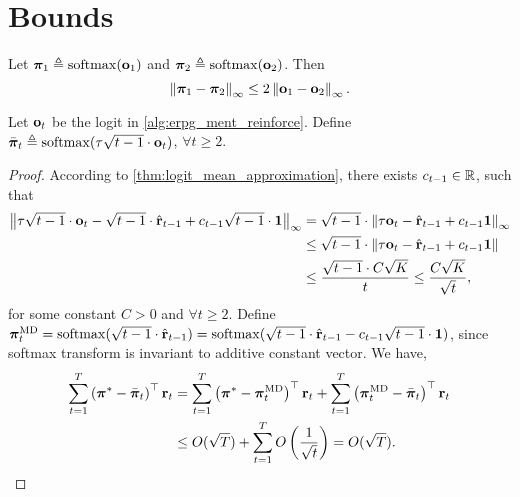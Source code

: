 \section{Bounds}

\begin{lem}
Let ${\boldsymbol{\pi}}_1 \triangleq \mathrm{softmax}({\mathbf{o}}_1)$ and ${\boldsymbol{\pi}}_2 \triangleq \mathrm{softmax}({\mathbf{o}}_2)$. Then
\begin{equation*}
    \left\| {\boldsymbol{\pi}}_1 - {\boldsymbol{\pi}}_2 \right\|_\infty \le  2 \left\| {\mathbf{o}}_1 - {\mathbf{o}}_2 \right\|_\infty.
\end{equation*}
\end{lem}

\begin{thm}
Let ${\mathbf{o}}_t$ be the logit in \cref{alg:erpg_ment_reinforce}. Define $\bar{{\boldsymbol{\pi}}}_t \triangleq \mathrm{softmax}(\tau \sqrt{t-1} \cdot {\mathbf{o}}_t)$, $\forall t \ge 2$.
\end{thm}
\begin{proof}
According to \cref{thm:logit_mean_approximation}, there exists $c_{t-1} \in {\mathbb{R}}$, such that
\begin{equation*}
\begin{split}
    \left\| \tau \sqrt{t-1} \cdot {\mathbf{o}}_t - \sqrt{t-1} \cdot \hat{{\mathbf{r}}}_{t-1} + c_{t-1} \sqrt{t-1} \cdot {\mathbf{1}} \right\|_\infty &= \sqrt{t-1} \cdot \left\| \tau {\mathbf{o}}_t - \hat{{\mathbf{r}}}_{t-1} + c_{t-1} {\mathbf{1}} \right\|_\infty \\
    &\le \sqrt{t-1} \cdot \left\| \tau {\mathbf{o}}_t - \hat{{\mathbf{r}}}_{t-1} + c_{t-1} {\mathbf{1}} \right\| \\
    &\le \frac{\sqrt{t-1} \cdot C \sqrt{K}}{t} \le \frac{C \sqrt{K}}{\sqrt{t}},
\end{split}
\end{equation*}
for some constant $C > 0$ and $\forall t \ge 2$. Define ${\boldsymbol{\pi}}_t^{\text{MD}} = \mathrm{softmax}(\sqrt{t-1} \cdot \hat{{\mathbf{r}}}_{t-1}) = \mathrm{softmax}(\sqrt{t-1} \cdot \hat{{\mathbf{r}}}_{t-1} - c_{t-1} \sqrt{t-1} \cdot {\mathbf{1}})$, since softmax transform is invariant to additive constant vector. We have,
\begin{equation*}
\begin{split}
    \sum\limits_{t=1}^{T}{ \left( {\boldsymbol{\pi}}^* - \bar{{\boldsymbol{\pi}}}_t \right)^\top {\mathbf{r}}_t} &= \sum\limits_{t=1}^{T}{ \left( {\boldsymbol{\pi}}^* - {\boldsymbol{\pi}}_{t}^{\text{MD}} \right)^\top {\mathbf{r}}_t} + \sum\limits_{t=1}^{T}{ \left( {\boldsymbol{\pi}}_{t}^{\text{MD}} - \bar{{\boldsymbol{\pi}}}_t \right)^\top {\mathbf{r}}_t} \\
    &\le O(\sqrt{T}) + \sum\limits_{t=1}^{T}{ O\left( \frac{1}{\sqrt{t}} \right) } = O(\sqrt{T}). \qedhere
\end{split}
\end{equation*}
\end{proof}